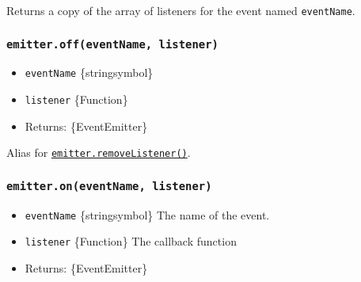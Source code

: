 Returns a copy of the array of listeners for the event named
\texttt{eventName}.

\begin{Shaded}
\begin{Highlighting}[]
\NormalTok{(}\OperatorTok{,}\KeywordTok{=\textgreater{}}\NormalTok{ \{}
  \NormalTok{(}\NormalTok{)}\OperatorTok{;}
\NormalTok{\})}\OperatorTok{;}
\NormalTok{(}\NormalTok{)))}\OperatorTok{;}
\end{Highlighting}
\end{Shaded}

\subsubsection{\texorpdfstring{\texttt{emitter.off(eventName,\ listener)}}{emitter.off(eventName, listener)}}\label{emitter.offeventname-listener}

\begin{itemize}
\tightlist
\item
  \texttt{eventName} \{string\textbar symbol\}
\item
  \texttt{listener} \{Function\}
\item
  Returns: \{EventEmitter\}
\end{itemize}

Alias for
\hyperref[emitterremovelistenereventname-listener]{\texttt{emitter.removeListener()}}.

\subsubsection{\texorpdfstring{\texttt{emitter.on(eventName,\ listener)}}{emitter.on(eventName, listener)}}\label{emitter.oneventname-listener}

\begin{itemize}
\tightlist
\item
  \texttt{eventName} \{string\textbar symbol\} The name of the event.
\item
  \texttt{listener} \{Function\} The callback function
\item
  Returns: \{EventEmitter\}
\end{itemize}

